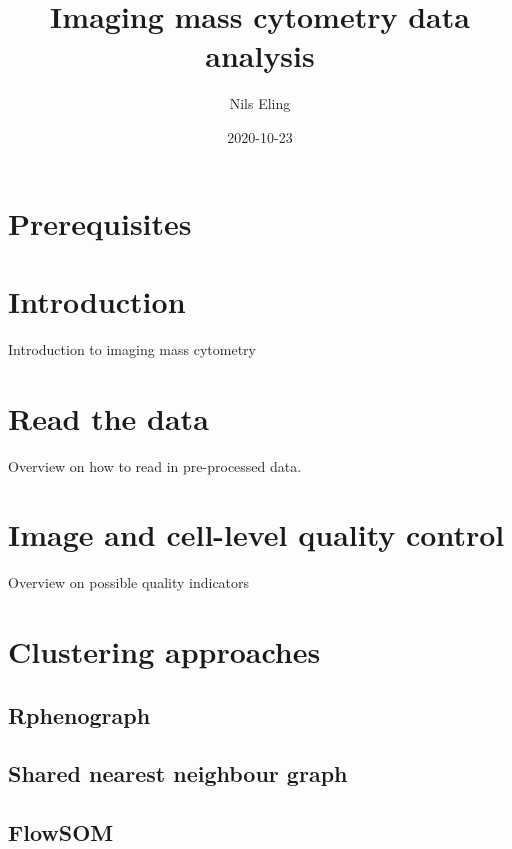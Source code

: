\documentclass[
]{book}
\title{Imaging mass cytometry data analysis}
\author{Nils Eling}
\date{2020-10-23}
\begin{document}
\maketitle

{
\setcounter{tocdepth}{1}
\tableofcontents
}
\hypertarget{prerequisites}{%
\chapter{Prerequisites}\label{prerequisites}}

\hypertarget{intro}{%
\chapter{Introduction}\label{intro}}

Introduction to imaging mass cytometry

\hypertarget{read-the-data}{%
\chapter{Read the data}\label{read-the-data}}

Overview on how to read in pre-processed data.

\hypertarget{image-and-cell-level-quality-control}{%
\chapter{Image and cell-level quality control}\label{image-and-cell-level-quality-control}}

Overview on possible quality indicators

\hypertarget{clustering-approaches}{%
\chapter{Clustering approaches}\label{clustering-approaches}}

\hypertarget{rphenograph}{%
\section{Rphenograph}\label{rphenograph}}

\hypertarget{shared-nearest-neighbour-graph}{%
\section{Shared nearest neighbour graph}\label{shared-nearest-neighbour-graph}}

\hypertarget{flowsom}{%
\section{FlowSOM}\label{flowsom}}
\end{document}

